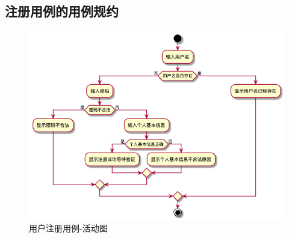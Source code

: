 \subsection{注册用例的用例规约}

\begin{figure}[htp]
        \centering
        \includegraphics[width=12cm]{figure/usecase/uc_sub/uc_enroll.png}
        \caption{用户注册用例-活动图}
        \label{fig:enroll-uml}
    \end{figure}
    

